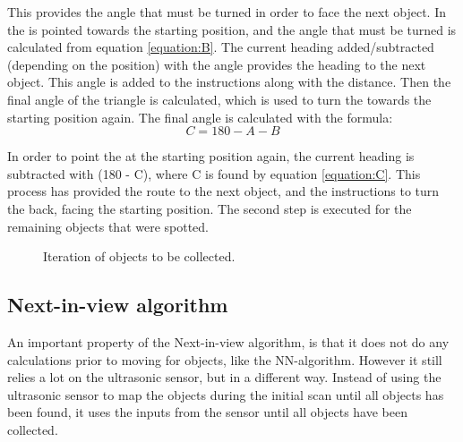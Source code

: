 This provides the angle that must be turned in order to face the next object. In  the \projname{} is pointed towards the starting position, and the angle that must be turned is calculated from equation \ref{equation:B}. The current heading added/subtracted (depending on the position) with the angle provides the heading to the next object. This angle is added to the instructions along with the distance. Then the final angle of the triangle is calculated, which is used to turn the \projname{} towards the starting position again. The final angle is calculated with the formula:
\begin{equation}
C = 180 - A - B \label{equation:C}
\end{equation}

In order to point the \projname{} at the starting position again, the current heading is subtracted with (180 - C), where C is found by equation \ref{equation:C}. This process has provided the route to the next object, and the instructions to turn the \projname{} back, facing the starting position. The second step is executed for the remaining objects that were spotted. 

\begin{figure}[H]
     \caption{\label{fig:object_navigation_iteration} Iteration of objects to be collected.}
\end{figure}


\subsection{Next-in-view algorithm} \label{sec:niv-algorithm}
An important property of the Next-in-view algorithm, is that it does not do any calculations prior to moving for objects, like the NN-algorithm. However it still relies a lot on the ultrasonic sensor, but in a different way. Instead of using the ultrasonic sensor to map the objects during the initial scan until all objects has been found, it uses the inputs from the sensor until all objects have been collected.

